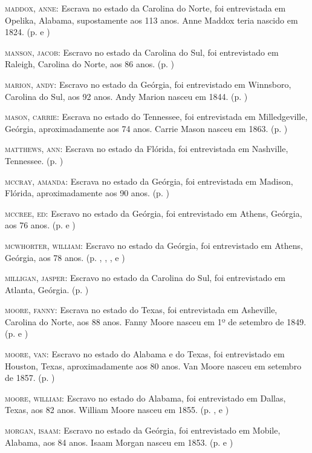 \begin{Parskip}
\textsc{maddox, anne:} Escrava no estado da Carolina do Norte, foi
entrevistada em Opelika, Alabama, supostamente aos 113 anos. Anne Maddox
teria nascido em 1824. (p. \pageref{ref179} e \pageref{ref180})

\textsc{manson, jacob:} Escravo no estado da Carolina do Sul, foi
entrevistado em Raleigh, Carolina do Norte, aos 86 anos. (p. \pageref{ref181})

\textsc{marion, andy:} Escravo no estado da Geórgia, foi entrevistado em
Winnsboro, Carolina do Sul, aos 92 anos. Andy Marion nasceu em 1844. (p. \pageref{ref182})

\textsc{mason, carrie:} Escrava no estado do Tennessee, foi entrevistada
em Milledgeville, Geórgia, aproximadamente aos 74 anos. Carrie Mason
nasceu em 1863. (p. \pageref{ref183})

\textsc{matthews, ann:} Escrava no estado da Flórida, foi entrevistada
em Nashville, Tennessee. (p. \pageref{ref184})

\textsc{mccray, amanda:} Escrava no estado da Geórgia, foi entrevistada
em Madison, Flórida, aproximadamente aos 90 anos. (p. \pageref{ref185})

\textsc{mccree, ed:} Escravo no estado da Geórgia, foi entrevistado em
Athens, Geórgia, aos 76 anos. (p. \pageref{ref186} e \pageref{ref187})

\textsc{mcwhorter, william:} Escravo no estado da Geórgia, foi
entrevistado em Athens, Geórgia, aos 78 anos. (p. \pageref{ref188}, \pageref{ref189}, \pageref{ref190}, \pageref{ref191} e \pageref{ref192})

\textsc{milligan, jasper:} Escravo no estado da Carolina do Sul, foi
entrevistado em Atlanta, Geórgia. (p. \pageref{ref193})

\textsc{moore, fanny:} Escrava no estado do Texas, foi entrevistada em
Asheville, Carolina do Norte, aos 88 anos. Fanny Moore nasceu em 1º de
setembro de 1849. (p. \pageref{ref194} e \pageref{ref195})

\textsc{moore, van:} Escravo no estado do Alabama e do Texas, foi
entrevistado em Houston, Texas, aproximadamente aos 80 anos. Van Moore
nasceu em setembro de 1857. (p. \pageref{ref196})

\textsc{moore, william:} Escravo no estado do Alabama, foi entrevistado
em Dallas, Texas, aos 82 anos. William Moore nasceu em 1855. (p. \pageref{ref197}, \pageref{ref198} e \pageref{ref199})

\textsc{morgan, isaam:} Escravo no estado da Geórgia, foi entrevistado
em Mobile, Alabama, aos 84 anos. Isaam Morgan nasceu em 1853. (p. \pageref{ref200} e \pageref{ref201})


\end{Parskip}
